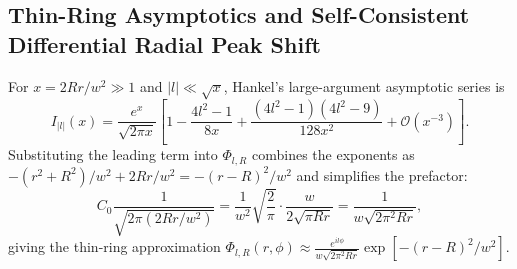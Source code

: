 \documentclass[10pt,letterpaper]{article}
\newcommand{\abs}[1]{\lvert #1 \rvert}
\numberwithin{equation}{section}
\begin{document}
\subsection{Thin-Ring Asymptotics and Self-Consistent Differential Radial Peak Shift}
For $x = 2Rr/w^2 \gg 1$ and $\abs{l} \ll \sqrt{x}$, Hankel's large-argument asymptotic series is
\begin{equation}
  I_{\abs{l}}(x) = \frac{e^x}{\sqrt{2\pi x}}\left[1 - \frac{4l^2 - 1}{8x} + \frac{(4l^2-1)(4l^2-9)}{128 x^2} + \mathcal{O}(x^{-3})\right].
  \label{eq:walk_hankel}
\end{equation}
Substituting the leading term into $\Phi_{l,R}$ combines the exponents as $-(r^2+R^2)/w^2 + 2Rr/w^2 = -(r-R)^2/w^2$ and simplifies the prefactor:
\begin{equation}
  C_0 \frac{1}{\sqrt{2\pi (2Rr/w^2)}} = \frac{1}{w^2}\sqrt{\frac{2}{\pi}} \cdot \frac{w}{2\sqrt{\pi Rr}} = \frac{1}{w\sqrt{2\pi^2 Rr}},
\end{equation}
giving the thin-ring approximation $\Phi_{l,R}(r,\phi) \approx \frac{e^{il\phi}}{w\sqrt{2\pi^2 Rr}} \exp[-(r-R)^2/w^2]$.
\end{document}
